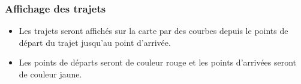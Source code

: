 \documentclass[12pt]{article}
\begin{document}
			\subsubsection{Affichage des trajets}
				\begin{itemize}
					\item Les trajets seront affichés sur la carte par des courbes depuis le points de départ du trajet jusqu'au point d'arrivée.
					\item Les points de départs seront de couleur rouge et les points d'arrivées seront de couleur jaune.
				\end{itemize}

\end{document}
